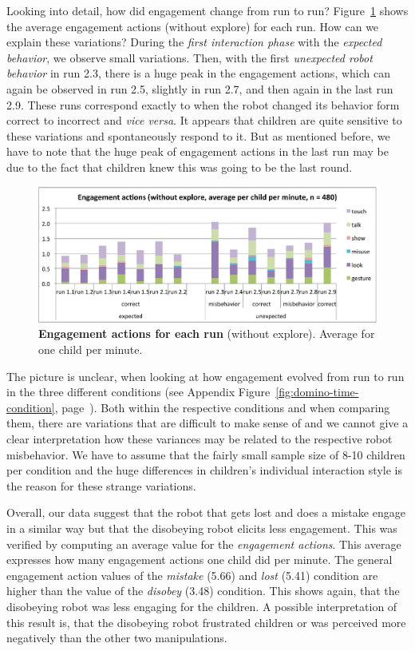\documentclass{sig-alternate}
\begin{document}
Looking into detail, how did engagement change from run to run?
Figure~\ref{fig:domino-time-active} shows the average engagement actions
(without explore) for each run. How can we explain these variations? During the
\textit{first interaction phase} with the \textit{expected behavior}, we observe
small variations. Then, with the first \textit{unexpected robot behavior} in run
2.3, there is a huge peak in the engagement actions, which can again be observed
in run 2.5, slightly in run 2.7, and then again in the last run 2.9. These runs
correspond exactly to when the robot changed its behavior form correct to
incorrect and \textit{vice versa}. It appears that children are quite sensitive
to these variations and spontaneously respond to it. But as mentioned before, we
have to note that the huge peak of engagement actions in the last run may be due
to the fact that children knew this was going to be the last round.

\begin{figure}[!h] 
\centering 
\includegraphics[width=0.99\columnwidth]{domino-time-active.pdf} 
\caption[Engagement Actions for Each Run]{\small \textbf{Engagement actions for each run} (without explore). Average for one child per minute.}
\label{fig:domino-time-active} 
\end{figure}

The picture is unclear, when looking at how engagement evolved from run to run
in the three different conditions (see Appendix
Figure~\ref{fig:domino-time-condition},
page~\pageref{fig:domino-time-condition}). Both within the respective conditions
and when comparing them, there are variations that are difficult to make sense
of and we cannot give a clear interpretation how these variances may be related
to the respective robot misbehavior. We have to assume that the fairly small
sample size of 8-10 children per condition and the huge differences in
children's individual interaction style is the reason for these strange
variations.

Overall, our data suggest that the robot that gets lost and does a mistake
engage in a similar way but that the disobeying robot elicits less engagement.
This was verified by computing an average value for the \textit{engagement
actions}. This average expresses how many engagement actions one child did per
minute. The general engagement action values of the \textit{mistake} (5.66) and
\textit{lost} (5.41) condition are higher than the value of the \textit{disobey}
(3.48) condition. This shows again, that the disobeying robot was less engaging
for the children. A possible interpretation of this result is, that the
disobeying robot frustrated children or was perceived more negatively than the
other two manipulations.
\end{document}
